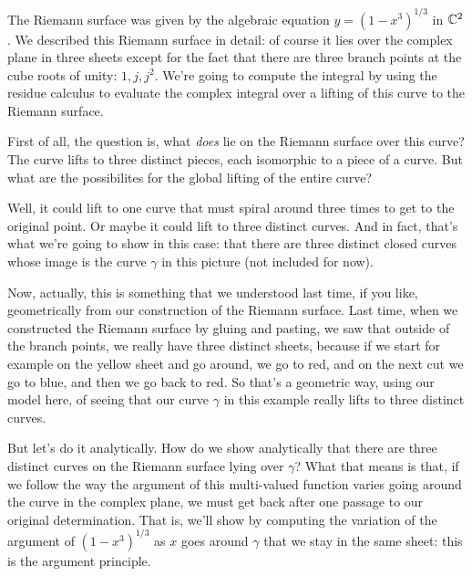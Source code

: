 \documentclass{article}
\begin{document}
The Riemann surface was given by the algebraic equation \(y = (1 - x^3)^{1/3}\) in \(\mathbb{C}^2\). We described this Riemann surface in detail: of course it lies over the complex plane in three sheets except for the fact that there are three branch points at the cube roots of unity: \(1, j, j^2\). We're going to compute the integral by using the residue calculus to evaluate the complex integral over a lifting of this curve to the Riemann surface.

First of all, the question is, what \textit{does} lie on the Riemann surface over this curve? The curve lifts to three distinct pieces, each isomorphic to a piece of a curve. But what are the possibilites for the global lifting of the entire curve?

Well, it could lift to one curve that must spiral around three times to get to the original point. Or maybe it could lift to three distinct curves. And in fact, that's what we're going to show in this case: that there are three distinct closed curves whose image is the curve \(\gamma\) in this picture (not included for now).

Now, actually, this is something that we understood last time, if you like, geometrically from our construction of the Riemann surface. Last time, when we constructed the Riemann surface by gluing and pasting, we saw that outside of the branch points, we really have three distinct sheets, because if we start for example on the yellow sheet and go around, we go to red, and on the next cut we go to blue, and then we go back to red. So that's a geometric way, using our model here, of seeing that our curve \(\gamma\) in this example really lifts to three distinct curves.

But let's do it analytically. How do we show analytically that there are three distinct curves on the Riemann surface lying over \(\gamma\)? What that means is that, if we follow the way the argument of this multi-valued function varies going around the curve in the complex plane, we must get back after one passage to our original determination. That is, we'll show by computing the variation of the argument of \((1 - x^3)^{1/3}\) as \(x\) goes around \(\gamma\) that we stay in the same sheet: this is the argument principle.
\end{document}

